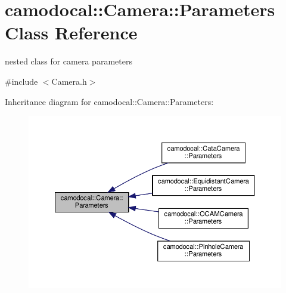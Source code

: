 \hypertarget{classcamodocal_1_1Camera_1_1Parameters}{}\section{camodocal\+:\+:Camera\+:\+:Parameters Class Reference}
\label{classcamodocal_1_1Camera_1_1Parameters}


nested class for camera parameters  




{\ttfamily \#include $<$Camera.\+h$>$}



Inheritance diagram for camodocal\+:\+:Camera\+:\+:Parameters\+:\nopagebreak
\begin{figure}[H]
\begin{center}
\leavevmode
\includegraphics[width=350pt]{classcamodocal_1_1Camera_1_1Parameters__inherit__graph}
\end{center}
\end{figure}

